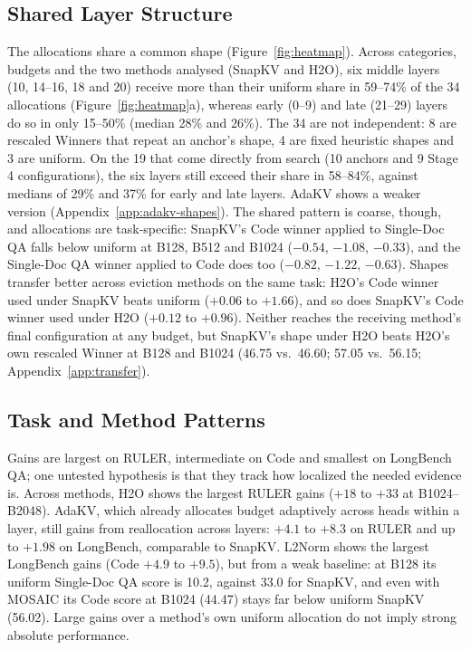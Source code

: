 \documentclass[11pt]{article}
\begin{document}
\subsection{Shared Layer Structure}
\label{sec:shared}

The allocations share a common shape (Figure~\ref{fig:heatmap}). Across categories, budgets and the two methods analysed (SnapKV and H2O), six middle layers (10, 14--16, 18 and 20) receive more than their uniform share in 59--74\% of the 34 allocations (Figure~\ref{fig:heatmap}a), whereas early (0--9) and late (21--29) layers do so in only 15--50\% (median 28\% and 26\%). The 34 are not independent: 8 are rescaled Winners that repeat an anchor's shape, 4 are fixed heuristic shapes and 3 are uniform. On the 19 that come directly from search (10 anchors and 9 Stage 4 configurations), the six layers still exceed their share in 58--84\%, against medians of 29\% and 37\% for early and late layers. AdaKV shows a weaker version (Appendix~\ref{app:adakv-shapes}). The shared pattern is coarse, though, and allocations are task-specific: SnapKV's Code winner applied to Single-Doc QA falls below uniform at B128, B512 and B1024 ($-0.54$, $-1.08$, $-0.33$), and the Single-Doc QA winner applied to Code does too ($-0.82$, $-1.22$, $-0.63$). Shapes transfer better across eviction methods on the same task: H2O's Code winner used under SnapKV beats uniform ($+0.06$ to $+1.66$), and so does SnapKV's Code winner used under H2O ($+0.12$ to $+0.96$). Neither reaches the receiving method's final configuration at any budget, but SnapKV's shape under H2O beats H2O's own rescaled Winner at B128 and B1024 (46.75 vs.\ 46.60; 57.05 vs.\ 56.15; Appendix~\ref{app:transfer}).

\subsection{Task and Method Patterns}

Gains are largest on RULER, intermediate on Code and smallest on LongBench QA; one untested hypothesis is that they track how localized the needed evidence is. Across methods, H2O shows the largest RULER gains ($+18$ to $+33$ at B1024--B2048). AdaKV, which already allocates budget adaptively across heads within a layer, still gains from reallocation across layers: $+4.1$ to $+8.3$ on RULER and up to $+1.98$ on LongBench, comparable to SnapKV. L2Norm shows the largest LongBench gains (Code $+4.9$ to $+9.5$), but from a weak baseline: at B128 its uniform Single-Doc QA score is 10.2, against 33.0 for SnapKV, and even with MOSAIC its Code score at B1024 (44.47) stays far below uniform SnapKV (56.02). Large gains over a method's own uniform allocation do not imply strong absolute performance.
\end{document}
